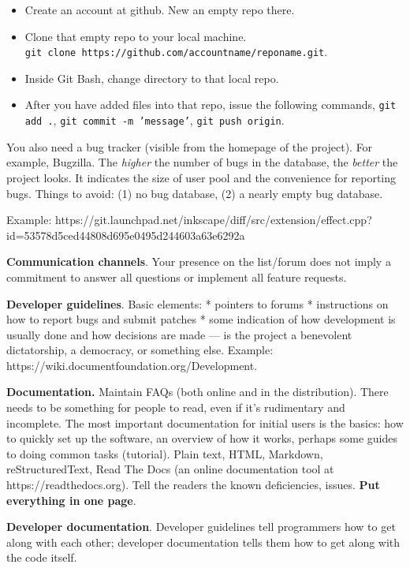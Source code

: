 \documentclass[landscape,30pt]{foils}
\begin{document}
\begin{itemize}
\item Create an account at github.  New an empty repo there.
\item Clone that empty repo to your local machine.  \\
  \texttt{git clone https://github.com/accountname/reponame.git}.
\item Inside Git Bash, change directory to that local repo.
\item After you have added files into that repo, issue the following commands, \texttt{git add .}, \texttt{git commit -m 'message'}, \texttt{git push origin}.
\end{itemize}


You also need a bug tracker (visible from the homepage of the
project).  For example, Bugzilla.   The {\em higher} the number of bugs in the database, the
{\em better} the project looks.  It indicates the size of user pool
and the convenience for reporting bugs.  Things to avoid: (1) no bug
database, (2) a nearly empty bug database.

Example: https://git.launchpad.net/inkscape/diff/src/extension/effect.cpp?id=53578d5ced44808d695e0495d244603a63e6292a

{\bf Communication channels}.  Your presence on the list/forum does not imply a commitment to answer all questions or implement all feature requests.

{\bf Developer guidelines}. Basic elements: *  pointers to forums  * instructions on how to report bugs and submit patches  *  some indication of how development is usually done and how decisions are made — is the project a
benevolent dictatorship, a democracy, or something else.  Example: https://wiki.documentfoundation.org/Development.

{\bf Documentation.}  Maintain FAQs (both online and in the
distribution). There needs to be something for people to read, even if
it's rudimentary and incomplete. The most important documentation for
initial users is the basics: how to quickly set up the software, an
overview of how it works, perhaps some guides to doing common tasks
(tutorial).  Plain text, HTML, Markdown, reStructuredText, Read The
Docs (an online documentation tool at https://readthedocs.org).  Tell the readers the known
deficiencies, issues.  {\bf Put everything in one page}.

{\bf Developer documentation}.  Developer guidelines tell programmers how to get along with each
other; developer documentation tells them how to get along with the code itself. 
\end{document}
